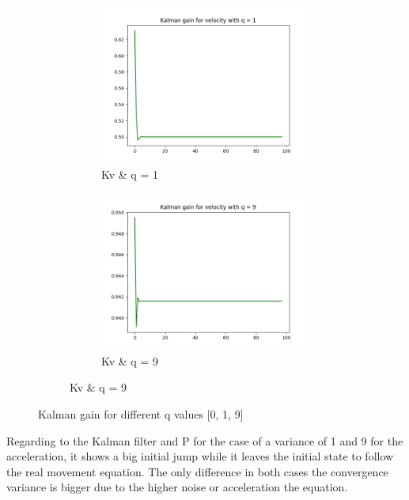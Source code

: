 \documentclass{article}
\begin{document}
\begin{figure}[H]
\begin{subfigure} {1\textwidth}
\begin{subfigure}{.3\textwidth}
                    \includegraphics[width=1\linewidth]{./img/k22_1.png}
                    \caption{Kv \& q = 1 }
                \end{subfigure}
                \begin{subfigure}{.3\textwidth}
                    \includegraphics[width=1\linewidth]{./img/k22_9.png}
                    \caption{Kv \& q = 9 }
                \end{subfigure}
            \end{subfigure} 
            \caption{Kalman gain for different q values [0, 1, 9]}
            \label{fig:kalman}
        \end{figure}

        Regarding to the Kalman filter and P for the case of a variance of 1 and 9 for the acceleration,
        it shows a big initial jump while it leaves the initial state to follow the real movement equation.
        The only difference in both cases the convergence variance is bigger due to the higher noise or acceleration the equation.
\end{document}
